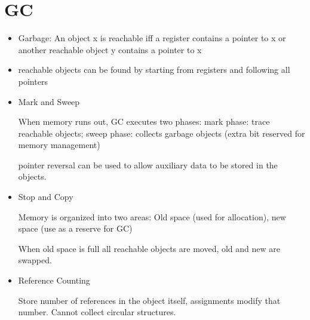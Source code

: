 \section*{GC}
\begin{itemize}
	
	\item Garbage: An object x is reachable iff a register contains a pointer to x or another reachable object y contains a pointer to x
	\item reachable objects can be found by starting from registers and following all pointers

\item Mark and Sweep
	
	When memory runs out, GC executes two phases: mark phase: trace reachable objects; sweep phase: collects garbage objects (extra bit reserved for memory management)
	
	pointer reversal can be used to allow auxiliary data to be stored in the objects.
	\item Stop and Copy
	
	Memory is organized into two areas: Old space (used for allocation), new space (use as a reserve for GC)
	
	When old space is full all reachable objects are moved, old and new are swapped.
	\item Reference Counting
	
	Store number of references in the object itself, assignments modify that number. Cannot collect circular structures.
	
\end{itemize}